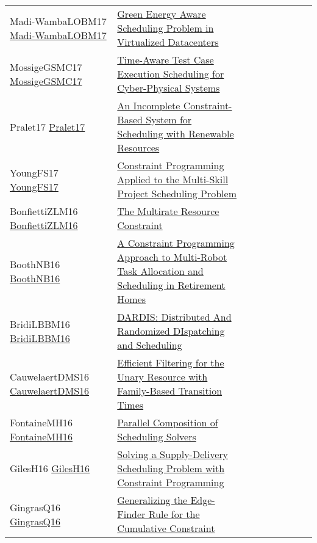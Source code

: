 {\begin{longtable}{p{3cm}p{7cm}lllllll}
Madi-WambaLOBM17 \href{https://doi.org/10.1109/ICPADS.2017.00089}{Madi-WambaLOBM17} &  \href{papers/Madi-WambaLOBM17.pdf}{Green Energy Aware Scheduling Problem in Virtualized Datacenters} &  &  &  &  &  &  & \\
MossigeGSMC17 \href{https://doi.org/10.1007/978-3-319-66158-2\_25}{MossigeGSMC17} &  \href{papers/MossigeGSMC17.pdf}{Time-Aware Test Case Execution Scheduling for Cyber-Physical Systems} &  &  &  &  &  &  & \\
Pralet17 \href{https://doi.org/10.1007/978-3-319-66158-2\_16}{Pralet17} &  \href{papers/Pralet17.pdf}{An Incomplete Constraint-Based System for Scheduling with Renewable Resources} &  &  &  &  &  &  & \\
YoungFS17 \href{https://doi.org/10.1007/978-3-319-66158-2\_20}{YoungFS17} &  \href{papers/YoungFS17.pdf}{Constraint Programming Applied to the Multi-Skill Project Scheduling Problem} &  &  &  &  &  &  & \\
BonfiettiZLM16 \href{https://doi.org/10.1007/978-3-319-44953-1\_8}{BonfiettiZLM16} &  \href{papers/BonfiettiZLM16.pdf}{The Multirate Resource Constraint} &  &  &  &  &  &  & \\
BoothNB16 \href{https://doi.org/10.1007/978-3-319-44953-1\_34}{BoothNB16} &  \href{papers/BoothNB16.pdf}{A Constraint Programming Approach to Multi-Robot Task Allocation and Scheduling in Retirement Homes} &  &  &  &  &  &  & \\
BridiLBBM16 \href{https://doi.org/10.3233/978-1-61499-672-9-1598}{BridiLBBM16} &  \href{papers/BridiLBBM16.pdf}{{DARDIS:} Distributed And Randomized DIspatching and Scheduling} &  &  &  &  &  &  & \\
CauwelaertDMS16 \href{https://doi.org/10.1007/978-3-319-44953-1\_33}{CauwelaertDMS16} &  \href{papers/CauwelaertDMS16.pdf}{Efficient Filtering for the Unary Resource with Family-Based Transition Times} &  &  &  &  &  &  & \\
FontaineMH16 \href{https://doi.org/10.1007/978-3-319-33954-2\_12}{FontaineMH16} &  \href{papers/FontaineMH16.pdf}{Parallel Composition of Scheduling Solvers} &  &  &  &  &  &  & \\
GilesH16 \href{https://doi.org/10.1007/978-3-319-44953-1\_38}{GilesH16} &  \href{papers/GilesH16.pdf}{Solving a Supply-Delivery Scheduling Problem with Constraint Programming} &  &  &  &  &  &  & \\
GingrasQ16 \href{http://www.ijcai.org/Abstract/16/440}{GingrasQ16} &  \href{papers/GingrasQ16.pdf}{Generalizing the Edge-Finder Rule for the Cumulative Constraint} &  &  &  &  &  &  & \\

\end{longtable}}
